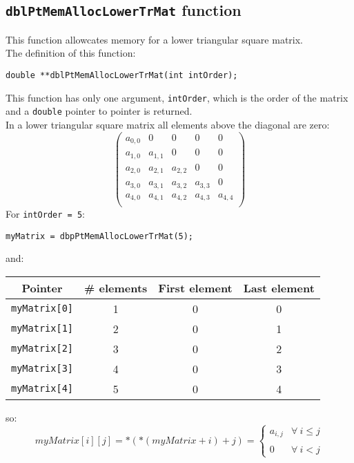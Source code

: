 \subsection{\texttt{dblPtMemAllocLowerTrMat} function} \label{sec:dblPtMemAllocLowerTrMat}

This function allowcates memory for a lower triangular square matrix.\\

The definition of this function:
%
\begin{verbatim}
double **dblPtMemAllocLowerTrMat(int intOrder);
\end{verbatim}

This function has only one argument, \texttt{intOrder}, which is the order of the matrix and a \texttt{double} pointer to pointer is returned.\\

In a lower triangular square matrix all elements above the diagonal are zero: 
%
\begin{displaymath}
\left( \begin{array}{ccccc}
  a_{0,0} & 0      & 0      & 0      & 0 \\
  a_{1,0} & a_{1,1} & 0      & 0      & 0 \\ 
  a_{2,0} & a_{2,1} & a_{2,2} & 0      & 0 \\
  a_{3,0} & a_{3,1} & a_{3,2} & a_{3,3} & 0 \\
  a_{4,0} & a_{4,1} & a_{4,2} & a_{4,3} & a_{4,4} \\
\end{array} \right)
\end{displaymath}
%
For \texttt{intOrder = 5}:
%
\begin{verbatim}
myMatrix = dbpPtMemAllocLowerTrMat(5);  
\end{verbatim}
%
and:
\begin{center}
  \begin{tabular}{|c|c|c|c|}
    \hline
    \textbf{Pointer} & \textbf{\# elements} & \textbf{First element} & \textbf{Last element}\\
    \hline
    \texttt{myMatrix[0]} & 1 & 0 & 0\\
    \hline
    \texttt{myMatrix[1]} & 2 & 0 & 1\\
    \hline
    \texttt{myMatrix[2]} & 3 & 0 & 2\\
    \hline
    \texttt{myMatrix[3]} & 4 & 0 & 3\\
    \hline
    \texttt{myMatrix[4]} & 5 & 0 & 4\\
    \hline
  \end{tabular}
\end{center}
%
so:
%
\begin{displaymath}
  myMatrix[i][j] = *(*(myMatrix + i) + j) = \left\{ \begin{array}{ll}
    a_{i,j} & \forall \ i \le j \\
     & \\
    0 & \forall \ i < j
    \end{array} \right.    
\end{displaymath}


